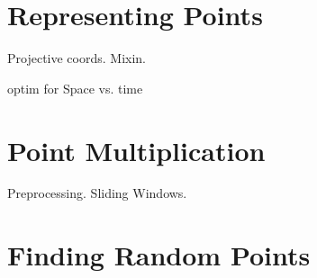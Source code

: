 \section {Representing Points}

Projective coords. Mixin.

optim for Space vs. time

\section {Point Multiplication}

Preprocessing. Sliding Windows.

\section {Finding Random Points}
